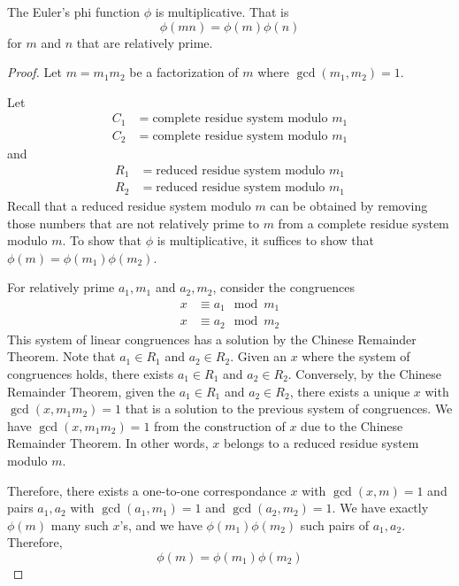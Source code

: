 \begin{theorem}
    The Euler's phi function $\phi$ is multiplicative. That is
    $$
    \phi(mn) = \phi(m) \phi(n)
    $$
    for $m$ and $n$ that are relatively prime.
\end{theorem}

\begin{proof}
    Let $m = m_1m_2$ be a factorization of $m$ where $\gcd(m_1,m_2) = 1$.

    Let
    $$
    \begin{aligned}
        C_1 &= \text{complete residue system modulo $m_1$} \\
        C_2 &= \text{complete residue system modulo $m_1$}
    \end{aligned}
    $$
    and
    $$
    \begin{aligned}
        R_1 &= \text{reduced residue system modulo $m_1$} \\
        R_2 &= \text{reduced residue system modulo $m_1$}
    \end{aligned}
    $$
    Recall that a reduced residue system modulo $m$ can be obtained by removing those numbers that are not relatively prime to $m$ from a complete residue system modulo $m$. To show that $\phi$ is multiplicative, it suffices to show that $\phi(m) = \phi(m_1) \phi(m_2)$.

    For relatively prime $a_1,m_1$ and $a_2,m_2$, consider the congruences
    $$
    \begin{aligned}
        x &\equiv a_1 \mod m_1 \\
        x &\equiv a_2 \mod m_2
    \end{aligned}
    $$
    This system of linear congruences has a solution by the Chinese Remainder Theorem. Note that $a_1 \in R_1$ and $a_2 \in R_2$. Given an $x$ where the system of congruences holds, there exists $a_1 \in R_1$ and $a_2 \in R_2$. Conversely, by the Chinese Remainder Theorem, given the $a_1 \in R_1$ and $a_2 \in R_2$, there exists a unique $x$ with $\gcd(x, m_1m_2) = 1$ that is a solution to the previous system of congruences. We have $\gcd(x,m_1m_2) = 1$ from the construction of $x$ due to the Chinese Remainder Theorem. In other words, $x$ belongs to a reduced residue system modulo $m$.

    Therefore, there exists a one-to-one correspondance $x$ with $\gcd(x,m) = 1$ and pairs $a_1,a_2$ with $\gcd(a_1,m_1) = 1$ and $\gcd(a_2,m_2) = 1$. We have exactly $\phi(m)$ many such $x$'s, and we have $\phi(m_1)\phi(m_2)$ such pairs of $a_1,a_2$. Therefore,
    $$
    \phi(m) = \phi(m_1) \phi(m_2)
    $$
\end{proof}

